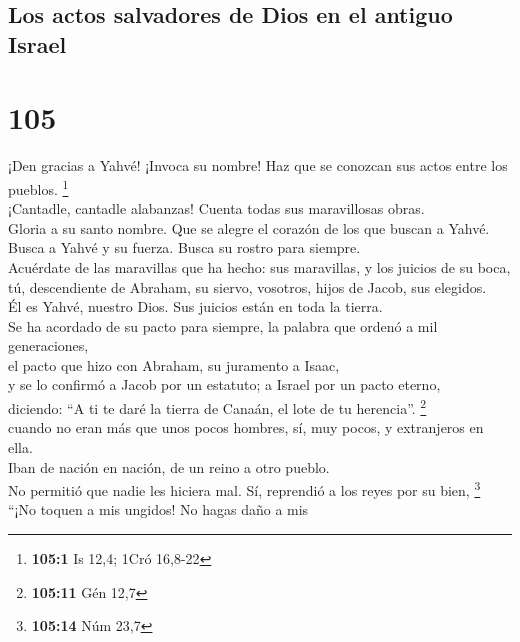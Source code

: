 \hypertarget{los-actos-salvadores-de-dios-en-el-antiguo-israel}{%
\subsection{Los actos salvadores de Dios en el antiguo
Israel}\label{los-actos-salvadores-de-dios-en-el-antiguo-israel}}

\hypertarget{section-102}{%
\section{105}\label{section-102}}

 ¡Den gracias a Yahvé! ¡Invoca su nombre! Haz que se
conozcan sus actos entre los pueblos. \footnote{\textbf{105:1} Is 12,4;
  1Cró 16,8-22}\\
 ¡Cantadle, cantadle alabanzas! Cuenta todas sus
maravillosas obras.\\
 Gloria a su santo nombre. Que se alegre el corazón de los
que buscan a Yahvé.\\
 Busca a Yahvé y su fuerza. Busca su rostro para
siempre.\\
 Acuérdate de las maravillas que ha hecho: sus maravillas,
y los juicios de su boca,\\
 tú, descendiente de Abraham, su siervo, vosotros, hijos
de Jacob, sus elegidos.\\
 Él es Yahvé, nuestro Dios. Sus juicios están en toda la
tierra.\\
 Se ha acordado de su pacto para siempre, la palabra que
ordenó a mil generaciones,\\
 el pacto que hizo con Abraham, su juramento a Isaac,\\
 y se lo confirmó a Jacob por un estatuto; a Israel por
un pacto eterno,\\
 diciendo: ``A ti te daré la tierra de Canaán, el lote de
tu herencia''. \footnote{\textbf{105:11} Gén 12,7}\\
 cuando no eran más que unos pocos hombres, sí, muy
pocos, y extranjeros en ella.\\
 Iban de nación en nación, de un reino a otro pueblo.\\
 No permitió que nadie les hiciera mal. Sí, reprendió a
los reyes por su bien, \footnote{\textbf{105:14} Núm 23,7}\\
 ``¡No toquen a mis ungidos! No hagas daño a mis
